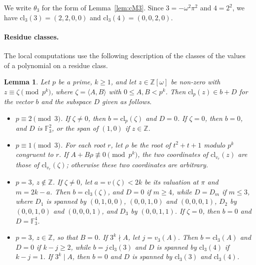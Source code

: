\documentclass[11pt]{article}
\newtheorem{lemma}[theorem]{Lemma}
\newcommand{\Z}{\mathbb{Z}}
\newcommand{\F}{\mathbb{F}}
\begin{document}
We write $\theta_3$ for the form of Lemma~\ref{lem:cM3}. Since $3=-\omega^2\pi^2$ and $4=2^2$, we have $\mathrm{cl}_3(3)=(2,2,0,0)$ and $\mathrm{cl}_3(4)=(0,0,2,0)$.

\paragraph{Residue classes.} The local computations use the following description of the classes of the values of a polynomial on a residue class.

\begin{lemma}\label{lem:cresidue}
Let $p$ be a prime, $k\geq1$, and let $z\in\Z[\omega]$ be non-zero with $z\equiv\zeta\pmod{p^k}$, where $\zeta=\langle A,B\rangle$ with $0\leq A,B<p^k$. Then $\mathrm{cl}_p(z)\in b+D$ for the vector $b$ and the subspace $D$ given as follows.
\begin{itemize}
\item[(i)] $p\equiv2\pmod3$. If $\zeta\neq0$, then $b=\mathrm{cl}_p(\zeta)$ and $D=0$. If $\zeta=0$, then $b=0$, and $D$ is $\F_3^2$, or the span of $(1,0)$ if $z\in\Z$.
\item[(ii)] $p\equiv1\pmod3$. For each root $r$, let $\rho$ be the root of $t^2+t+1$ modulo $p^k$ congruent to $r$. If $A+B\rho\not\equiv0\pmod{p^k}$, the two coordinates of $\mathrm{cl}_{v_r}(z)$ are those of $\mathrm{cl}_{v_r}(\zeta)$; otherwise these two coordinates are arbitrary.
\item[(iii)] $p=3$, $z\notin\Z$. If $\zeta\neq0$, let $a=v(\zeta)<2k$ be its valuation at $\pi$ and $m=2k-a$. Then $b=\mathrm{cl}_3(\zeta)$, and $D=0$ if $m\geq4$, while $D=D_m$ if $m\leq3$, where $D_1$ is spanned by $(0,1,0,0)$, $(0,0,1,0)$ and $(0,0,0,1)$, $D_2$ by $(0,0,1,0)$ and $(0,0,0,1)$, and $D_3$ by $(0,0,1,1)$. If $\zeta=0$, then $b=0$ and $D=\F_3^4$.
\item[(iv)] $p=3$, $z\in\Z$, so that $B=0$. If $3^k\nmid A$, let $j=v_3(A)$. Then $b=\mathrm{cl}_3(A)$ and $D=0$ if $k-j\geq2$, while $b=j\,\mathrm{cl}_3(3)$ and $D$ is spanned by $\mathrm{cl}_3(4)$ if $k-j=1$. If $3^k\mid A$, then $b=0$ and $D$ is spanned by $\mathrm{cl}_3(3)$ and $\mathrm{cl}_3(4)$.
\end{itemize}
\end{lemma}
\end{document}
